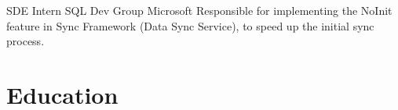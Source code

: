 \documentclass[10pt,a4paper,roman]{moderncv} %
\begin{document}
        {SDE Intern}
        {SQL Dev Group}
        {Microsoft}
        {}
        {Responsible for implementing the NoInit feature in Sync Framework (Data Sync Service), to speed up the initial sync process.}

\section{Education}
\end{document}
